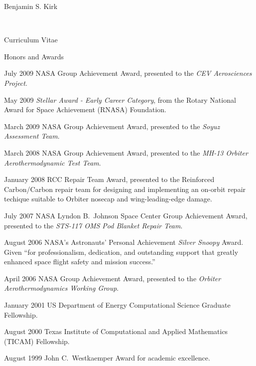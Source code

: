 \documentclass[11pt]{report}
\begin{document}
\begin{cv}{\centerline{Benjamin S. Kirk}\\
    \centerline{\small Curriculum Vitae}}
\begin{cvlist}{Honors and Awards}
    \item[July 2009]
    NASA Group Achievement Award, presented to the {\em CEV Aerosciences Project}.

    \item[May 2009]
      {\em Stellar Award - Early Career Category}, from the Rotary National Award for Space Achievement (RNASA) Foundation.

    \item[March 2009]
    NASA Group Achievement Award, presented to the {\em Soyuz Assessment Team}.
    
    \item[March 2008]
    NASA Group Achievement Award, presented to the {\em MH-13 Orbiter Aerothermodynamic Test Team}.

    \item[January 2008]
     RCC Repair Team Award, presented to the Reinforced Carbon/Carbon repair team for designing and implementing an on-orbit repair techique suitable to Orbiter nosecap and wing-leading-edge damage.

    \item[July 2007]
      NASA Lyndon B.~Johnson Space Center Group Achievement Award, presented to the {\em STS-117 OMS Pod Blanket Repair Team}.

    \item[August 2006]
      NASA's Astronauts' Personal Achievement {\em Silver Snoopy} Award. Given ``for professionalism, dedication, and outstanding support that greatly enhanced space flight safety and mission success.''
      
    \item[April 2006]
      NASA Group Achievement Award, presented to the {\em Orbiter Aerothermodynamics Working Group}.
      
    \item[January 2001]
      US Department of Energy Computational Science Graduate Fellowship.
      
    \item[August 2000]
      Texas Institute of Computational and Applied Mathematics (TICAM) Fellowship.
      
    \item[August 1999]
      John C.\ Westkaemper Award for academic excellence.
  \end{cvlist}



\end{cv}
\end{document}
